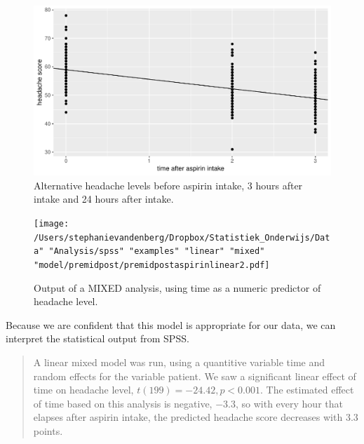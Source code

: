 \documentclass[]{report}\usepackage[]{graphicx}\usepackage[]{color}
\makeatletter
\def\maxwidth{ %
  \ifdim\Gin@nat@width>\linewidth
    \linewidth
  \else
    \Gin@nat@width
  \fi
}
\newenvironment{knitrout}{}{} %
\makeatother
\begin{document}
\begin{knitrout}
\color{fgcolor}\begin{figure}

{\centering \includegraphics[width=\maxwidth]{figure/analysispremidpost6-1} 

}

\caption[Alternative headache levels before aspirin intake, 3 hours after intake and 24 hours after intake]{Alternative headache levels before aspirin intake, 3 hours after intake and 24 hours after intake.}\label{fig:analysispremidpost6}
\end{figure}


\end{knitrout}



\begin{figure}[h]
    \begin{center}
       \texttt{[image: /Users/stephanievandenberg/Dropbox/Statistiek\_Onderwijs/Data" "Analysis/spss" "examples" "linear" "mixed" "model/premidpost/premidpostaspirinlinear2.pdf]}
    \end{center}
    \label{fig:premidpostaspirinlinear2}
    \caption{Output of a MIXED analysis, using time as a numeric predictor of headache level.}
\end{figure}


Because we are confident that this model is appropriate for our data, we can interpret the statistical output from SPSS. 

\begin{quotation}
A linear mixed model was run, using a quantitive variable time and random effects for the variable patient. We saw a significant linear effect of time on headache level, $t(199)=-24.42, p < 0.001$. The estimated effect of time based on this analysis is negative, $-3.3$, so with every hour that elapses after aspirin intake, the predicted headache score decreases with 3.3 points. 
\end{quotation}
\end{document}
